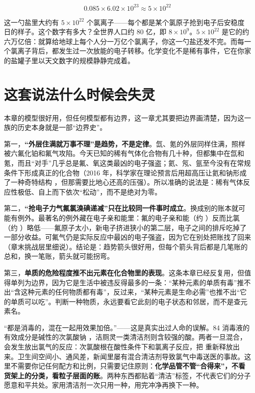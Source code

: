 \[0.085 \times 6.02\times 10^{23} \approx 5\times 10^{22}\]

这一勺盐里大约有 $5\times 10^{22}$ 个氯离子——每个都是某个氯原子抢到电子后安稳度日的样子。这个数字有多大？全世界人口约 80 亿，即 $8\times 10^{9}$。$5\times 10^{22}$ 是它的约六万亿倍：就算给地球上每个人分一万亿个氯离子，你这一勺盐还发不完。而每一个氯离子背后，都发生过一次放能的电子转移。化学变化不是稀有事件，它在你家的盐罐子里以天文数字的规模静静完成着。

\section{这套说法什么时候会失灵}

本章的模型很好用，但任何模型都有边界，这一章尤其要把边界画清楚，因为这一族的历史本身就是一部“边界史”。

第一，\textbf{“外层住满就万事不理”是趋势，不是定律}。氙、氪的外层同样住满，照样被六氟化铂和氟气攻陷。今天已知的稀有气体化合物有几十种，但都集中在氙和氪，而且“对手”几乎总是氟、氧这类最凶的电子强盗；氦、氖、氩至今没有在常规条件下形成真正的化合物（2016 年，科学家在理论预言后用超高压让氦和钠形成了一种奇特结构 ，但那需要比地心还高的压强）。所以准确的说法是：稀有气体反应性极低、自上而下依次“松动”，而不是绝对为零。

第二，\textbf{“抢电子力气氟氯溴碘递减”只在比较同一件事时成立}。换成别的账本就可能有例外。最著名的例外藏在电子亲和能里：氟的电子亲和能（约 ）反而比氯（约 ）略低——氟原子太小，新电子挤进狭小的第二层，电子之间的排斥吃掉了一部分收益。可氟气仍是实际反应中最凶的电子强盗，因为它在别处把账找了回来（章末挑战层里细说）。结论是：趋势箭头很好用，但每个箭头背后都是几笔账的总和，换一笔账，箭头就可能拐弯。

第三，\textbf{单质的危险程度推不出元素在化合物里的表现}。这条本章已经反复用，但值得单列为边界，因为它是生活中被违反得最多的一条：“某种元素的单质有毒”推不出“含这种元素的任何物质都有毒”，反过来，“某种元素是生命必需”也推不出“它的单质可以吃”。判断一种物质，永远要看它此刻的电子状态和邻居，而不是查元素名。

\begin{wuqu}
“都是消毒的，混在一起用效果加倍。”——这是真实出过人命的误解。84 消毒液的有效成分是碱性的次氯酸钠 ，洁厕灵一类清洁剂则含较强的酸。两者一旦混合，会发生放出氯气的反应：次氯酸根在酸性条件下和氯离子反应，把  重新释放出来。卫生间空间小、通风差，新闻里屡有混合清洁剂导致氯气中毒送医的事故。这里不需要你记任何配方和比例，只需要记住原则：\textbf{化学品管不管“合得来”，不看货架上的分类，看粒子层面的账}。两种东西都贴着“清洁”标签，不代表它们的分子愿意和平共处。家用清洁剂一次只用一种，用完冲净再换下一种。
\end{wuqu}

